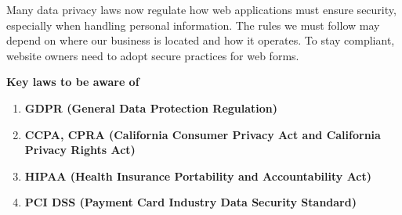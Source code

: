 \documentclass[12pt,oneside,openright,a4paper]{cpe-english-project}
\begin{document}
	Many data privacy laws now regulate how web applications must ensure security, especially when handling personal information. The rules we must follow may depend on where our business is located and how it operates. To stay compliant, website owners need to adopt secure practices for web forms.

\textbf{Key laws to be aware of}
\begin{enumerate}
	\item \textbf{GDPR (General Data Protection Regulation)}
	\item \textbf{CCPA, CPRA (California Consumer Privacy Act and California Privacy Rights Act)}
	\item \textbf{HIPAA (Health Insurance Portability and Accountability Act)}
	\item \textbf{PCI DSS (Payment Card Industry Data Security Standard)}
\end{enumerate}
\end{document}
